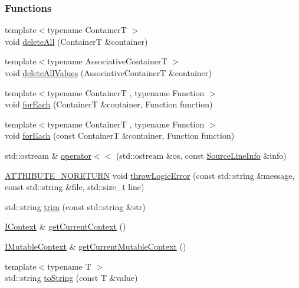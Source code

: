 \subsubsection*{Functions}
\begin{DoxyCompactItemize}
\item 
{\footnotesize template$<$typename Container\-T $>$ }\\void \hyperlink{namespaceCatch_aadf9786550a462740ec355f8219863a9}{delete\-All} (Container\-T \&container)
\item 
{\footnotesize template$<$typename Associative\-Container\-T $>$ }\\void \hyperlink{namespaceCatch_af2fcec1d4bd984fe19ff8b9a432c36a8}{delete\-All\-Values} (Associative\-Container\-T \&container)
\item 
{\footnotesize template$<$typename Container\-T , typename Function $>$ }\\void \hyperlink{namespaceCatch_a9f7e030a07e17848442215e851911206}{for\-Each} (Container\-T \&container, Function function)
\item 
{\footnotesize template$<$typename Container\-T , typename Function $>$ }\\void \hyperlink{namespaceCatch_ade633ef745f88327d7d446b592a3f7a8}{for\-Each} (const Container\-T \&container, Function function)
\item 
std\-::ostream \& \hyperlink{namespaceCatch_abc04163ce72b83e77eef0c989e2b06fb}{operator$<$$<$} (std\-::ostream \&os, const \hyperlink{structCatch_1_1SourceLineInfo}{Source\-Line\-Info} \&info)
\item 
\hyperlink{catch_8hpp_afaad0abfed30e8ee5ae7d27b5ecea29f}{A\-T\-T\-R\-I\-B\-U\-T\-E\-\_\-\-N\-O\-R\-E\-T\-U\-R\-N} void \hyperlink{namespaceCatch_a099994e7c7ee1801640a8d54b747ef3c}{throw\-Logic\-Error} (const std\-::string \&message, const std\-::string \&file, std\-::size\-\_\-t line)
\item 
std\-::string \hyperlink{namespaceCatch_a81f2f2023204d503dc7709042c5ee24c}{trim} (const std\-::string \&str)
\item 
\hyperlink{structCatch_1_1IContext}{I\-Context} \& \hyperlink{namespaceCatch_ad517cca9b21deb79101e90e5508dd161}{get\-Current\-Context} ()
\item 
\hyperlink{structCatch_1_1IMutableContext}{I\-Mutable\-Context} \& \hyperlink{namespaceCatch_af7bb0c32ab2453d2f53e92a96d15360e}{get\-Current\-Mutable\-Context} ()
\item 
{\footnotesize template$<$typename T $>$ }\\std\-::string \hyperlink{namespaceCatch_a9082052739ab716ae5bd7c6facf391e1}{to\-String} (const T \&value)

\end{DoxyCompactItemize}
